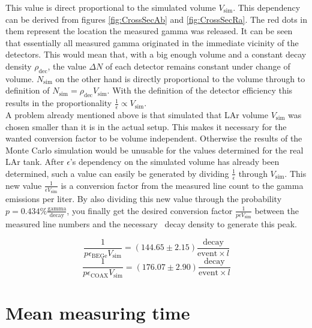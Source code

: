 \documentclass[encoding=utf8,british]{tumphthesis}
\begin{document}
This value is direct proportional to the simulated volume $V_{\mathrm{sim}}$.
This dependency can be derived from figures \ref{fig:CrossSecAb} and \ref{fig:CrossSecRa}.
The red dots in them represent the location the measured gamma was released.
It can be seen that essentially all measured gamma originated in the immediate vicinity of the detectors.
This would mean that, with a big enough volume and a constant decay density $\rho_{\mathrm{dec}}$, the value $\Delta N$ of each detector remains constant under change of volume.
$N_{\mathrm{sim}}$ on the other hand is directly proportional to the volume through to definition of $N_{\mathrm{sim}} = \rho_{\mathrm{dec}} V_{\mathrm{sim}}$.
With the definition of the detector efficiency this results in the proportionality  $\frac{1}{\epsilon} \propto V_{\mathrm{sim}}$.
\\

A problem already mentioned above is that simulated that LAr volume $V_{\mathrm{sim}}$ was chosen smaller than it is in the actual setup. 
This makes it necessary for the wanted conversion factor to be volume independent.
Otherwise the results of the Monte Carlo simulation would be unusable for the values determined for the real LAr tank.
After $\epsilon$'s dependency on the simulated volume has already been determined, such a value can easily be generated by dividing $\frac{1}{\epsilon}$ through $V_{\mathrm{sim}}$.
This new value $\frac{1}{\epsilon V_{\mathrm{sim}}}$ is a conversion factor from the measured line count to the gamma emissions per liter.
By also dividing this new value through the probability $p=0.434\% \frac{\mathrm{gamma}} {\mathrm{decay}}$, you finally get the desired conversion factor $\frac{1}{ p\epsilon V_ {\mathrm{sim}}}$ between the measured line numbers and the necessary \Kr\ decay density to generate this peak. 
 
\begin{equation*}
\frac{1}{ p \epsilon_{\mathrm{BEGe}} V_{\mathrm{sim}}} = (144.65\pm2.15) \frac{\mathrm{decay}}{\mathrm{event} \times l}
\end{equation*}
\begin{equation*}
\frac{1}{p \epsilon_{\mathrm{COAX}} V_{\mathrm{sim}}} = (176.07\pm2.90) \frac{\mathrm{decay}}{\mathrm{event} \times l}
\end{equation*}



\section{Mean measuring time}
\label{sec:CalcActiv}
\end{document}

